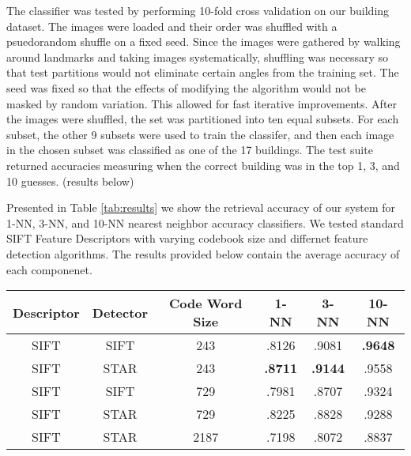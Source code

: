 The classifier was tested by performing 10-fold cross validation on our building dataset. 
The images were loaded and their order was shuffled with a psuedorandom shuffle on a fixed seed. 
Since the images were gathered by walking around landmarks and taking images systematically, shuffling was necessary so that test partitions would not eliminate certain angles from the training set. 
The seed was fixed so that the effects of modifying the algorithm would not be masked by random variation. This allowed for fast iterative improvements. After the images were shuffled, the set was partitioned into ten equal subsets. 
For each subset, the other 9 subsets were used to train the classifer, and then  each image in the chosen subset was classified as one of the 17 buildings. 
The test suite returned accuracies measuring when the correct building was in the top 1, 3, and 10 guesses. (results below)


Presented in Table \ref{tab:results} we show the retrieval accuracy of our system for 1-NN, 3-NN, and 10-NN nearest neighbor accuracy classifiers.
We tested standard SIFT Feature Descriptors with varying codebook size and differnet feature detection algorithms.
The results provided below contain the average accuracy of each componenet.

\begin{table*}[ht!]
\label{tab:results}
\centering
\begin{tabular}{| c | c | c | c | c | c |}
\hline
Descriptor & Detector & Code Word Size & 1-NN & 3-NN & 10-NN\\ \hline
SIFT & SIFT & 243 & .8126 & .9081  & \textbf{.9648}  \\ \hline
SIFT & STAR & 243 & \textbf{.8711} & \textbf{.9144} & .9558 \\ \hline
SIFT & SIFT & 729 & .7981 & .8707 & .9324 \\ \hline
SIFT & STAR & 729 & .8225 & .8828 & .9288 \\ \hline
SIFT & STAR & 2187 & .7198 & .8072 & .8837\\ \hline
\end{tabular}
\vspace*{10pt}
\caption{Retrieval Accuracy}
\end{table*}